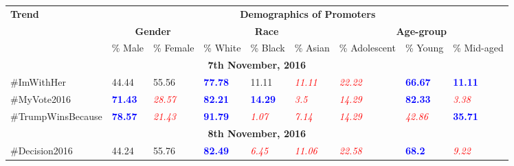 \documentclass[letterpaper]{article}
\begin{document}
\begin{table*}[t]
\center
\small
\begin{tabular}{|p{}|p{}|p{}||p{}|p{}|p{}||p{}|p{}|p{}|}
\hline
\multirow{3}{*}{\bf Trend} & \multicolumn{8}{c|}{\bf Demographics of Promoters} \\
\cline{2-9}
~ & \multicolumn{2}{c||}{\bf Gender}  & \multicolumn{3}{c||}{\bf Race} & \multicolumn{3}{c|}{\bf Age-group} \\
\cline{2-9}
~ & \% Male & \% Female & \% White & \% Black & \% Asian & \% Adolescent & \% Young & \% Mid-aged \\
\hline
\hline
\multicolumn{9}{|c|}{\bf 7th November, 2016} \\
\hline
\#ImWithHer & 44.44 & 55.56  & \textcolor{blue}{\bf 77.78} & 11.11 & \textcolor{red}{\it 11.11} &  \textcolor{red}{\it 22.22} & \textcolor{blue}{\bf 66.67} & \textcolor{blue}{\bf 11.11} \\
\hline
\#MyVote2016 & \textcolor{blue}{\bf 71.43} & \textcolor{red}{\it 28.57} &  \textcolor{blue}{\bf 82.21} & \textcolor{blue}{\bf 14.29} & \textcolor{red}{\it 3.5} &  \textcolor{red}{\it 14.29} & \textcolor{blue}{\bf 82.33} & \textcolor{red}{\it 3.38} \\
\hline
\#TrumpWinsBecause & \textcolor{blue}{\bf 78.57} & \textcolor{red}{\it 21.43} &  \textcolor{blue}{\bf 91.79} & \textcolor{red}{\it 1.07} & \textcolor{red}{\it 7.14} &  \textcolor{red}{\it 14.29} & \textcolor{red}{\it 42.86} & \textcolor{blue}{\bf 35.71}  \\
\hline
\hline
\multicolumn{9}{|c|}{\bf 8th November, 2016} \\
\hline
\#Decision2016 & 44.24 & 55.76 &  \textcolor{blue}{\bf 82.49} & \textcolor{red}{\it 6.45} & \textcolor{red}{\it 11.06} &  \textcolor{red}{\it 22.58} & \textcolor{blue}{\bf 68.2} & \textcolor{red}{\it 9.22}  \\

\end{tabular}
\end{table*}
\end{document}
